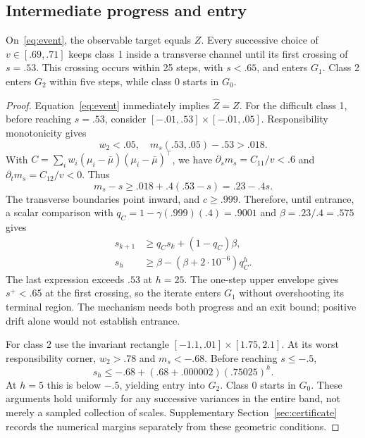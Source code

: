 \subsection{Intermediate progress and entry}
\begin{lemma}\label{lem:entry}
On~\eqref{eq:event}, the observable target equals $Z$. Every successive choice of $v\in[.69,.71]$ keeps class 1 inside a transverse channel until its first crossing of $s=.53$. This crossing occurs within 25 steps, with $s<.65$, and enters $G_1$. Class 2 enters $G_2$ within five steps, while class 0 starts in $G_0$.
\end{lemma}
\begin{proof}
Equation~\eqref{eq:event} immediately implies $\widehat Z=Z$. For the difficult class 1, before reaching $s=.53$, consider
$[-.01,.53]\times[-.01,.05]$. Responsibility monotonicity gives
\begin{equation}
w_2<.05,\quad m_s(.53,.05)-.53>.018.
\end{equation}
With $C=\sum_iw_i(\mu_i-\bar\mu)(\mu_i-\bar\mu)^\top$, we have $\partial_sm_s=C_{11}/v<.6$ and $\partial_tm_s=C_{12}/v<0$. Thus
\begin{equation}
m_s-s\ge .018+.4(.53-s)=.23-.4s.
\end{equation}
The transverse boundaries point inward, and $c\ge.999$. Therefore, until entrance, a scalar comparison with $q_C=1-\gamma(.999)(.4)=.9001$ and $\beta=.23/.4=.575$ gives
\begin{align}
s_{k+1}&\ge q_Cs_k+(1-q_C)\beta,\\
s_h&\ge\beta-(\beta+2\cdot10^{-6})q_C^h.
\end{align}
The last expression exceeds $.53$ at $h=25$. The one-step upper envelope gives $s^+<.65$ at the first crossing, so the iterate enters $G_1$ without overshooting its terminal region. The mechanism needs both progress and an exit bound; positive drift alone would not establish entrance.

For class 2 use the invariant rectangle $[-1.1,.01]\times[1.75,2.1]$. At its worst responsibility corner, $w_2>.78$ and $m_s<-.68$. Before reaching $s\le-.5$,
\begin{equation}
s_h\le-.68+(.68+.000002)(.75025)^h.
\end{equation}
At $h=5$ this is below $-.5$, yielding entry into $G_2$. Class 0 starts in $G_0$. These arguments hold uniformly for any successive variances in the entire band, not merely a sampled collection of scales. Supplementary Section~\ref{sec:certificate} records the numerical margins separately from these geometric conditions.
\end{proof}

